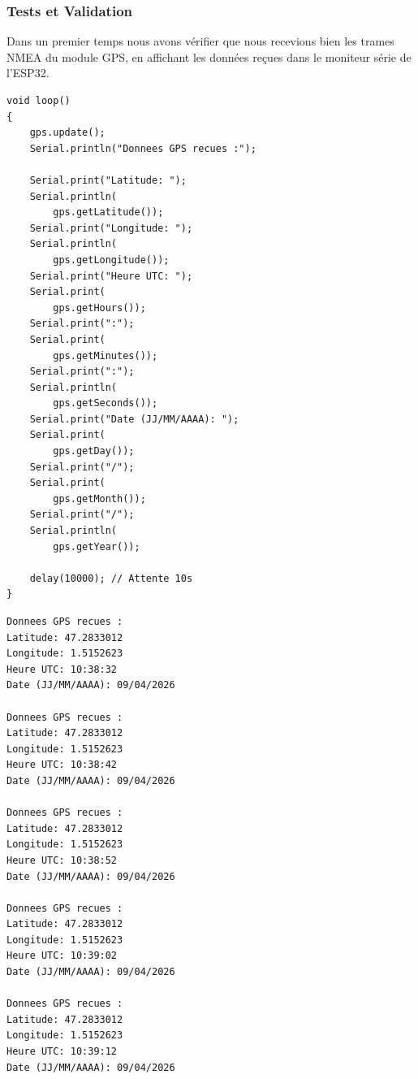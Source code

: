 \subsubsection*{Tests et Validation}

Dans un premier temps nous avons vérifier que nous recevions bien les trames NMEA du module GPS, en affichant les données 
reçues dans le moniteur série de l'ESP32.
\\

\noindent
\begin{minipage}[t]{0.45\textwidth}
\begin{lstlisting}[style=CStyle, caption={Exemple utilisation module GPS}, label={lst:gps_exemple}]
void loop()
{
    gps.update();
    Serial.println("Donnees GPS recues :");

    Serial.print("Latitude: ");
    Serial.println(
        gps.getLatitude());
    Serial.print("Longitude: ");
    Serial.println(
        gps.getLongitude());
    Serial.print("Heure UTC: ");
    Serial.print(
        gps.getHours());
    Serial.print(":");
    Serial.print(
        gps.getMinutes());
    Serial.print(":");
    Serial.println(
        gps.getSeconds());
    Serial.print("Date (JJ/MM/AAAA): ");
    Serial.print(
        gps.getDay());
    Serial.print("/");
    Serial.print(
        gps.getMonth());
    Serial.print("/");
    Serial.println(
        gps.getYear());

    delay(10000); // Attente 10s 
}
\end{lstlisting}
\end{minipage}
\hfill
\begin{minipage}[t]{0.45\textwidth}
\begin{lstlisting}[style=CStyle, caption={Moniteur Série de l'ESP32}, label={lst:moniteur_exemple}]
Donnees GPS recues :
Latitude: 47.2833012
Longitude: 1.5152623
Heure UTC: 10:38:32
Date (JJ/MM/AAAA): 09/04/2026

Donnees GPS recues :
Latitude: 47.2833012
Longitude: 1.5152623
Heure UTC: 10:38:42
Date (JJ/MM/AAAA): 09/04/2026

Donnees GPS recues :
Latitude: 47.2833012
Longitude: 1.5152623
Heure UTC: 10:38:52
Date (JJ/MM/AAAA): 09/04/2026

Donnees GPS recues :
Latitude: 47.2833012
Longitude: 1.5152623
Heure UTC: 10:39:02
Date (JJ/MM/AAAA): 09/04/2026

Donnees GPS recues :
Latitude: 47.2833012
Longitude: 1.5152623
Heure UTC: 10:39:12
Date (JJ/MM/AAAA): 09/04/2026
\end{lstlisting}
\end{minipage}

